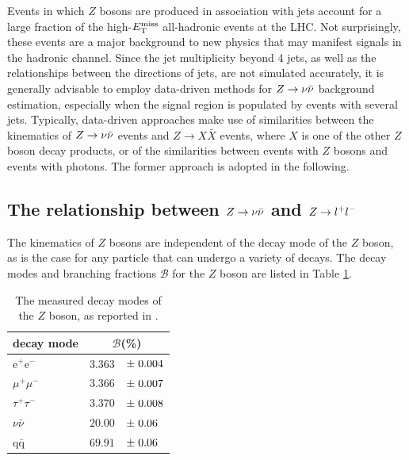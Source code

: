 Events in which $Z$ bosons are produced in association with jets account for a large fraction of the high-$E_{\text{T}}^{\rm miss}$ all-hadronic events at the LHC. Not surprisingly, these events are a major background to new physics that may manifest signals in the hadronic channel. Since the jet multiplicity beyond 4 jets, as well as the relationships between the directions of jets, are not simulated accurately, it is generally advisable to employ data-driven methods for $Z\rightarrow \nu\bar{\nu}$ background estimation, especially when the signal region is populated by events with several jets. Typically, data-driven approaches make use of similarities between the kinematics of $Z\rightarrow \nu\bar{\nu}$ events and $Z\rightarrow X\bar{X}$ events, where $X$ is one of the other $Z$ boson decay products, or of the similarities between events with $Z$ bosons and events with photons. The former approach is adopted in the following.


\subsection{The relationship between $Z\rightarrow \nu\bar{\nu}$ and $Z\rightarrow l^+l^-$}
The kinematics of $Z$ bosons are independent of the decay mode of the $Z$ boson, as is the case for any particle that can undergo a variety of decays. The decay modes and branching fractions $\mathcal{B}$ for the $Z$ boson are listed in Table \ref{tab:zdecay}. 

\begin{table}[h]
\vspace{0.5cm}
\centering
\begin{tabular}{l|rl}
\hline
decay mode & \multicolumn{2}{c}{$\mathcal{B}$(\%)}\\
\hline
e$^+$e$^-$ & $3.363$&\hspace{-3mm}$\pm \hspace{1mm}0.004$\\
$\mu^+\mu^-$ & $3.366$&\hspace{-3mm}$\pm \hspace{1mm}0.007$\\
$\tau^+\tau^-$ & $3.370$&\hspace{-3mm}$\pm \hspace{1mm}0.008$\\
$\nu\bar{\nu}$ & $20.00$&\hspace{-3mm}$\pm \hspace{1mm}0.06$\\
q$\bar{\text{q}}$ & $69.91$&\hspace{-3mm}$\pm \hspace{1mm}0.06$\\
\hline
\end{tabular}
\caption{The measured decay modes of the $Z$ boson, as reported in \cite{Agashe:2014kda}.}
\label{tab:zdecay}
\end{table}

